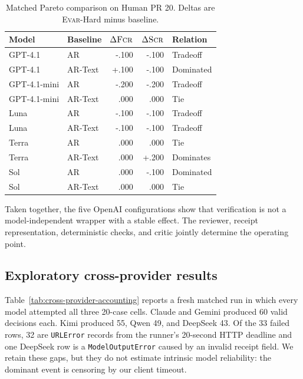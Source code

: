 \documentclass[acmsmall,screen,review,anonymous]{acmart}
\newcommand{\evar}{\textsc{Evar}\xspace}
\newcommand{\fcr}{\textsc{Fcr}\xspace}
\newcommand{\scr}{\textsc{Scr}\xspace}
\begin{document}
\begin{table}[H]
\centering
\caption{Matched Pareto comparison on Human PR 20. Deltas are \evar-Hard minus baseline.}
\label{tab:pareto}
\small
\begin{tabular}{@{}llrrl@{}}
\toprule
Model & Baseline & $\Delta\fcr$ & $\Delta\scr$ & Relation \\
\midrule
GPT-4.1 & AR & -.100 & -.100 & Tradeoff \\
GPT-4.1 & AR-Text & +.100 & -.100 & Dominated \\
GPT-4.1-mini & AR & -.200 & -.200 & Tradeoff \\
GPT-4.1-mini & AR-Text & .000 & .000 & Tie \\
Luna & AR & -.100 & -.100 & Tradeoff \\
Luna & AR-Text & -.100 & -.100 & Tradeoff \\
Terra & AR & .000 & .000 & Tie \\
Terra & AR-Text & .000 & +.200 & Dominates \\
Sol & AR & .000 & -.100 & Dominated \\
Sol & AR-Text & .000 & .000 & Tie \\
\bottomrule
\end{tabular}
\end{table}

Taken together, the five OpenAI configurations show that verification is not a model-independent wrapper with a stable effect. The reviewer, receipt representation, deterministic checks, and critic jointly determine the operating point.

\subsection{Exploratory cross-provider results}

Table~\ref{tab:cross-provider-accounting} reports a fresh matched run in which every model attempted all three 20-case cells. Claude and Gemini produced 60 valid decisions each. Kimi produced 55, Qwen 49, and DeepSeek 43. Of the 33 failed rows, 32 are \texttt{URLError} records from the runner's 20-second HTTP deadline and one DeepSeek row is a \texttt{ModelOutputError} caused by an invalid receipt field. We retain these gaps, but they do not estimate intrinsic model reliability: the dominant event is censoring by our client timeout.
\end{document}
